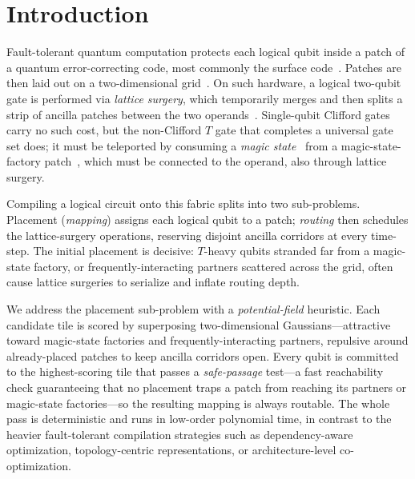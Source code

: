 \section{Introduction}
\label{sec:intro}

Fault-tolerant quantum computation protects each logical qubit inside a patch of
a quantum error-correcting code, most commonly the surface code~\cite{fowler2012surface}.
Patches are then laid out on a two-dimensional grid~\cite{litinski2019game}. On such
hardware, a logical two-qubit gate is performed via \emph{lattice surgery}, which 
temporarily merges and then splits a strip of ancilla patches between the 
two operands~\cite{horsman2012lattice,litinski2019game}. 
Single-qubit Clifford gates carry no such cost, but the non-Clifford $T$ gate 
that completes a universal gate set does; 
it must be teleported by consuming a \emph{magic state}~\cite{bravyi2005magic} 
from a magic-state-factory patch~\cite{litinski2019game}, which must be connected to 
the operand, also through lattice surgery.

Compiling a logical circuit onto this fabric splits into two sub-problems. 
Placement (\emph{mapping}) assigns each logical qubit to a patch; \emph{routing}
then schedules the lattice-surgery operations, reserving disjoint
ancilla corridors at every time-step.
The initial placement is decisive: $T$-heavy qubits stranded far from a
magic-state factory, or frequently-interacting partners scattered across the grid,
often cause lattice surgeries to serialize and inflate routing depth.

We address the placement sub-problem with a \emph{potential-field} heuristic. 
Each candidate tile is scored by superposing two-dimensional Gaussians---attractive
toward magic-state factories and frequently-interacting partners, repulsive around
already-placed patches to keep ancilla corridors open. Every qubit is committed to
the highest-scoring tile that passes a \emph{safe-passage} test---a fast reachability
check guaranteeing that no placement traps a patch from reaching its partners or
magic-state factories---so the resulting mapping is always routable. 
The whole pass is deterministic and runs in
low-order polynomial time, in contrast to the heavier fault-tolerant compilation
strategies such as dependency-aware optimization, topology-centric
representations, or architecture-level co-optimization.

